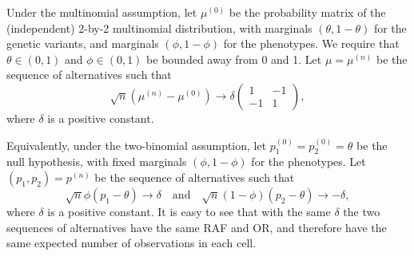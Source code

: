 Under the multinomial assumption, let $\mu^{(0)}$ be the probability matrix of the (independent) 2-by-2 multinomial distribution, with marginals $(\theta, 1-\theta)$ for the genetic variants, and marginals $(\phi, 1-\phi)$ for the phenotypes.
We require that $\theta\in(0,1)$ and $\phi\in(0,1)$ be bounded away from 0 and 1.
Let $\mu = \mu^{(n)}$ be the sequence of alternatives such that 
\begin{equation} \label{eq:alternative-multinomial}
    \sqrt{n}(\mu^{(n)} - \mu^{(0)}) \rightarrow \delta \begin{pmatrix} 1 & -1 \\ -1 & 1 \end{pmatrix},
\end{equation}
where $\delta$ is a positive constant.

Equivalently, under the two-binomial assumption, let $p_1^{(0)} = p_2^{(0)} = \theta$ be the null hypothesis, with fixed marginals $(\phi, 1-\phi)$ for the phenotypes.
Let $(p_1, p_2) = p^{(n)}$ be the sequence of alternatives such that 
\begin{equation} \label{eq:alternative-two-bionomial}
    \sqrt{n}\phi (p_1-\theta) \rightarrow \delta
    \quad \text{and} \quad 
    \sqrt{n}(1-\phi) (p_2-\theta) \rightarrow -\delta,
\end{equation}
where $\delta$ is a positive constant.
It is easy to see that with the same $\delta$ the two sequences of alternatives have the same RAF and OR, and therefore have the same expected number of observations in each cell.

